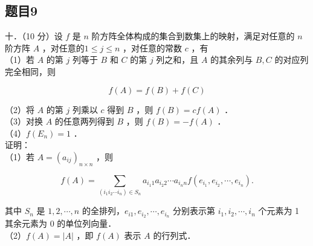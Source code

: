\documentclass{article}
\begin{document}
\subsection{题目9}
十．（10 分）设 \(f\) 是 \(n\) 阶方阵全体构成的集合到数集上的映射，满足对任意的 \(n\) 阶方阵 \(A\) ，对任意的\(1 \leq j \leq n\) ，对任意的常数 \(c\) ，有\\
（1）若 \(A\) 的第 \(j\) 列等于 \(B\) 和 \(C\) 的第 \(j\) 列之和，且 \(A\) 的其余列与 \(B, C\) 的对应列完全相同，则

\[
f(A)=f(B)+f(C)
\]

（2）将 \(A\) 的第 \(j\) 列乘以 \(c\) 得到 \(B\) ，则 \(f(B)=c f(A)\) ．\\
（3）对换 \(A\) 的任意两列得到 \(B\) ，则 \(f(B)=-f(A)\) ．\\
（4）\(f\left(E_{n}\right)=1\) ．\\
证明：\\
（1）若 \(A=\left(a_{i j}\right)_{n \times n}\) ，则

\[
f(A)=\sum_{\left(i_{1} i_{2} \cdots i_{n}\right) \in S_{n}} a_{i_{1} 1} a_{i_{2} 2} \cdots a_{i_{n} n} f\left(e_{i_{1}}, e_{i_{2}}, \cdots, e_{i_{n}}\right) .
\]

其中 \(S_{n}\) 是 \(1,2, \cdots, n\) 的全排列，\(e_{i 1}, e_{i_{2}}, \cdots, e_{i_{n}}\) 分别表示第 \(i_{1}, i_{2}, \cdots, i_{n}\) 个元素为 1 其余元素为 0 的单位列向量．\\
（2）\(f(A)=|A|\) ，即 \(f(A)\) 表示 \(A\) 的行列式．
\end{document}
